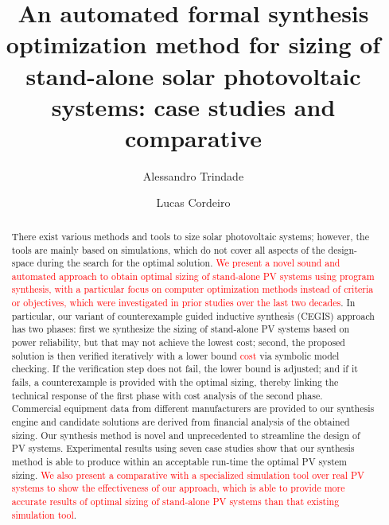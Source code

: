 \documentclass[review]{elsarticle}
\begin{document}
\begin{frontmatter}

\title{An automated formal synthesis optimization method for sizing of stand-alone solar photovoltaic systems: case studies and comparative}
%
%
\author[mymainaddress]{Alessandro Trindade}

\author[mysecondaryaddress]{Lucas Cordeiro}


\address[mymainaddress]{Federal University of Amazonas, Av. Rodrigo Octávio, 6200, Coroado I, 69077-000 Manaus-AM-Brazil}
\address[mysecondaryaddress]{University of Manchester, School of Computer Science, Kilburn Building, Manchester M13 9PL}

\begin{abstract}
There exist various methods and tools to size solar photovoltaic systems; however, the tools are mainly based on simulations, which do not cover all aspects of the design-space during the search for the optimal solution. \textcolor{red}{We present a novel sound and automated approach to obtain optimal sizing of stand-alone PV systems using program synthesis, with a particular focus on computer optimization methods instead of criteria or objectives, which were investigated in prior studies over the last two decades}. In particular, our variant of counterexample guided inductive synthesis (CEGIS) approach has two phases: first we synthesize the sizing of stand-alone PV systems based on power reliability, but that may not achieve the lowest cost; second, the proposed solution is then verified iteratively with a lower bound \textcolor{red}{cost} via symbolic model checking. If the verification step does not fail, the lower bound is adjusted; and if it fails, a counterexample is provided with the optimal sizing, thereby linking the technical response of the first phase with cost analysis of the second phase. Commercial equipment data from different manufacturers are provided to our synthesis engine and candidate solutions are derived from financial analysis of the obtained sizing. Our synthesis method is novel and unprecedented to streamline the design of PV systems. Experimental results using seven case studies show that our synthesis method is able to produce within an acceptable run-time the optimal PV system sizing. \textcolor{red}{We also present a comparative with a specialized simulation tool over real PV systems to show the effectiveness of our approach, which is able to provide more accurate results of optimal sizing of stand-alone PV systems than that existing simulation tool}.
\end{abstract}


\end{frontmatter}
\end{document}
